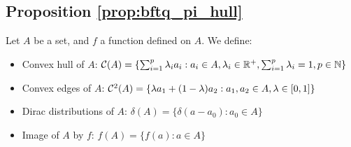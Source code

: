 








\subsection{Proposition \ref{prop:bftq_pi_hull}}
\begin{definition}
Let $A$ be a set, and $f$ a function defined on $A$. We define:

\begin{itemize}
    \item Convex hull of $A$: $\mathcal{C}(A) = \{\sum_{i=1}^p \lambda_i a_i: a_i\in A, \lambda_i\in\mathbb{R}^+, \sum_{i=1}^p \lambda_i = 1, p\in\mathbb{N}\}$
    \item Convex edges of $A$: $\mathcal{C}^2(A) = \{\lambda a_1 + (1-\lambda)a_2: a_1, a_2\in A, \lambda\in[0, 1]\}$
    \item Dirac distributions of $A$: $\delta(A) = \{\delta(a-a_0): a_0\in A\}$ 
    \item Image of $A$ by $f$: $f(A) = \{f(a): a\in A\}$
\end{itemize}
\end{definition}

